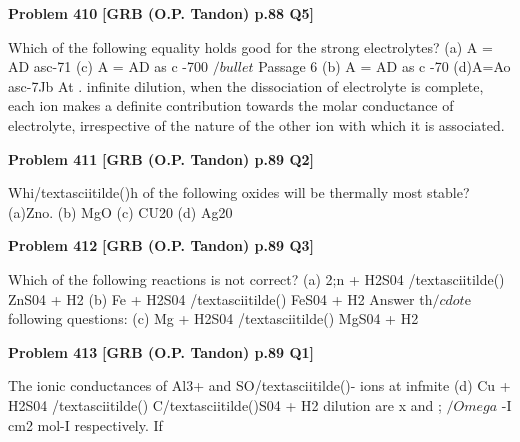 \begin{problembox}
\textbf{Problem 410} \hfill \textbf{[GRB (O.P. Tandon) p.88 Q5]}
\label{q:ext-grb_all_questions-410}

Which of the following equality holds good for the strong 
electrolytes? 
(a) A = AD asc-71 
(c) A = AD as c -700 
$/bullet$ Passage 6 
(b) A = AD as c -70 
(d)A=Ao asc-7Jb 
At . infinite dilution, when the dissociation of electrolyte is 
complete, each ion makes a definite contribution towards the molar 
conductance of electrolyte, irrespective of the nature of the other ion 
with which it is associated.
\end{problembox}

\begin{problembox}
\textbf{Problem 411} \hfill \textbf{[GRB (O.P. Tandon) p.89 Q2]}
\label{q:ext-grb_all_questions-411}

Whi/textasciitilde()h of the following oxides will be thermally most stable? 
(a)Zno. 
(b) MgO 
(c) CU20 
(d) Ag20
\end{problembox}

\begin{problembox}
\textbf{Problem 412} \hfill \textbf{[GRB (O.P. Tandon) p.89 Q3]}
\label{q:ext-grb_all_questions-412}

Which of the following reactions is not correct? 
(a) 2;n + H2S04 /textasciitilde() 
ZnS04 + H2 
(b) Fe + H2S04 /textasciitilde() 
FeS04 + H2 
Answer th$/cdot$e following questions: 
(c) Mg + H2S04 /textasciitilde() 
MgS04 + H2
\end{problembox}

\begin{problembox}
\textbf{Problem 413} \hfill \textbf{[GRB (O.P. Tandon) p.89 Q1]}
\label{q:ext-grb_all_questions-413}

The ionic conductances of Al3+ and SO/textasciitilde()- ions at infmite 
(d) Cu + H2S04 /textasciitilde() 
C/textasciitilde()S04 + H2 
dilution are x and ; $/Omega$ -I cm2 mol-I respectively. If
\end{problembox}

